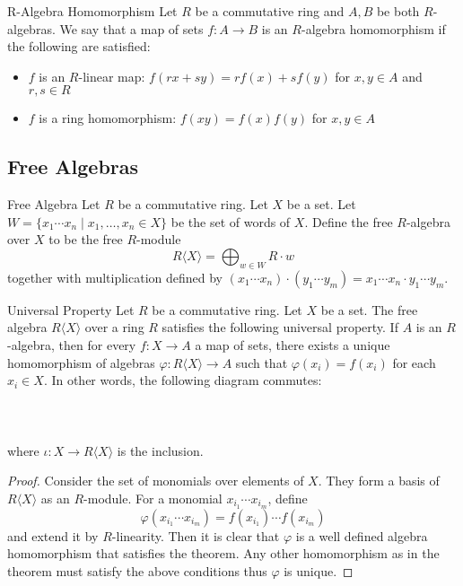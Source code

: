 \documentclass[a4paper]{article}
\begin{document}
\begin{defn}{R-Algebra Homomorphism}{} Let $R$ be a commutative ring and $A,B$ be both $R$-algebras. We say that a map of sets $f:A\to B$ is an $R$-algebra homomorphism if the following are satisfied: 
\begin{itemize}
\item $f$ is an $R$-linear map: $f(rx+sy)=rf(x)+sf(y)$ for $x,y\in A$ and $r,s\in R$
\item $f$ is a ring homomorphism: $f(xy)=f(x)f(y)$ for $x,y\in A$
\end{itemize}
\end{defn}

\subsection{Free Algebras}
\begin{defn}{Free Algebra}{} Let $R$ be a commutative ring. Let $X$ be a set. Let $W=\{x_1\cdots x_n\;|\;x_1,\dots,x_n\in X\}$ be the set of words of $X$. Define the free $R$-algebra over $X$ to be the free $R$-module $$R\langle X\rangle=\bigoplus_{w\in W}R\cdot w$$ together with multiplication defined by $(x_1\cdots x_n)\cdot(y_1\cdots y_m)=x_1\cdots x_n\cdot y_1\cdots y_m$. 
\end{defn}

\begin{prp}{Universal Property}{} Let $R$ be a commutative ring. Let $X$ be a set. The free algebra $R\langle X\rangle$ over a ring $R$ satisfies the following universal property. If $A$ is an $R$-algebra, then for every $f:X\to A$ a map of sets, there exists a unique homomorphism of algebras $\varphi:R\langle X\rangle\to A$ such that $\varphi(x_i)=f(x_i)$ for each $x_i\in X$. In other words, the following diagram commutes: \\~\\
\\~\\
where $\iota:X\to R\langle X\rangle$ is the inclusion. \tcbline
\begin{proof}
Consider the set of monomials over elements of $X$. They form a basis of $R\langle X\rangle$ as an $R$-module. For a monomial $x_{i_1}\cdots x_{i_m}$, define $$\varphi(x_{i_1}\cdots x_{i_m})=f(x_{i_1})\cdots f(x_{i_m})$$ and extend it by $R$-linearity. Then it is clear that $\varphi$ is a well defined algebra homomorphism that satisfies the theorem. Any other homomorphism as in the theorem must satisfy the above conditions thus $\varphi$ is unique. 
\end{proof}
\end{prp}
\end{document}

